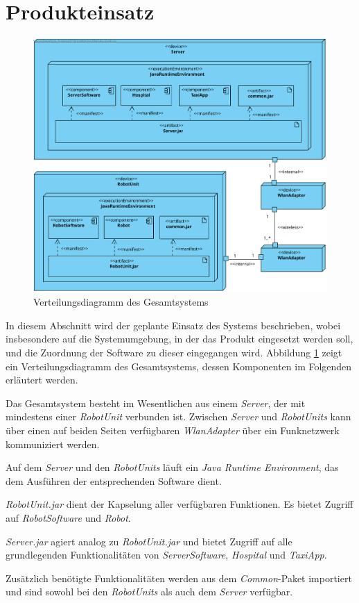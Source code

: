 \section{Produkteinsatz}

\begin{figure}[H]
	\centering
	\includegraphics[width=1\textwidth]{img/2-Entwurf-9-Produkteinsatz}
	\caption{Verteilungsdiagramm des Gesamtsystems}
	\label{ProdukteinsatzKomp}
\end{figure}

In diesem Abschnitt wird der geplante Einsatz des Systems beschrieben, wobei
insbesondere auf die Systemumgebung, in der das Produkt eingesetzt werden soll,
und die Zuordnung der Software zu dieser eingegangen wird.
Abbildung \ref{ProdukteinsatzKomp}
zeigt ein Verteilungsdiagramm des Gesamtsystems, dessen Komponenten im Folgenden
erläutert werden.

Das Gesamtsystem besteht im Wesentlichen aus einem \emph{Server}, der mit mindestens einer
\emph{RobotUnit} verbunden ist. Zwischen \emph{Server} und \emph{RobotUnits} kann über
einen auf beiden Seiten verfügbaren \emph{Wlan\-Adapter} über ein
Funknetzwerk kommuniziert werden.

Auf dem \emph{Server} und den \emph{RobotUnits} läuft ein \emph{Java Runtime Environment},
das dem Ausführen der entsprechenden Software dient.

\emph{RobotUnit.jar} dient der Kapselung aller verfügbaren Funktionen. Es bietet Zugriff
auf \emph{RobotSoftware} und \emph{Robot}.

\emph{Server.jar} agiert analog zu \emph{RobotUnit.jar} und bietet Zugriff auf alle grundlegenden
Funktionalitäten von \emph{ServerSoftware}, \emph{Hospital} und \emph{TaxiApp}.

Zusätzlich benötigte Funktionalitäten werden aus dem \emph{Common}-Paket importiert und sind
sowohl bei den \emph{RobotUnits} als auch dem \emph{Server} verfügbar.
